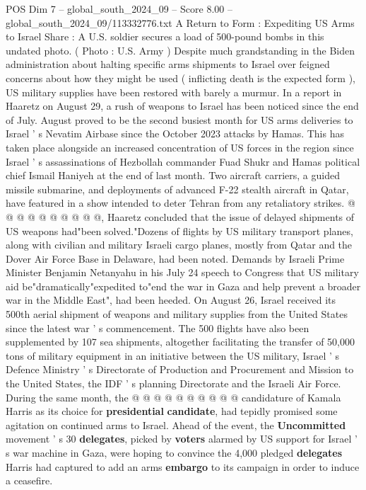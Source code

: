 \begin{textsample}{POS Dim 7 – global\_south\_2024\_09 – Score 8.00 – global\_south\_2024\_09/113332776.txt}  \label{ex:f7_pos_230}
A Return to Form : Expediting US Arms to Israel Share : A U.S. soldier secures a load of 500-pound bombs in this undated photo. ( Photo : U.S.
Army ) Despite much grandstanding in the Biden administration about halting specific arms shipments to Israel over feigned concerns about how they might be used ( inflicting death is the expected form ), US military supplies have been restored with barely a murmur.
In a report in Haaretz on August 29, a rush of weapons to Israel has been noticed since the end of July.
August proved to be the second busiest month for US arms deliveries to Israel ' s Nevatim Airbase since the October 2023 attacks by Hamas.
This has taken place alongside an increased concentration of US forces in the region since Israel ' s assassinations of Hezbollah commander Fuad Shukr and Hamas political chief Ismail Haniyeh at the end of last month.
Two aircraft carriers, a guided missile submarine, and deployments of advanced F-22 stealth aircraft in Qatar, have featured in a show intended to deter Tehran from any retaliatory strikes. @ @ @ @ @ @ @ @ @ @, Haaretz concluded that the issue of delayed shipments of US weapons had"been solved."Dozens of flights by US military transport planes, along with civilian and military Israeli cargo planes, mostly from Qatar and the Dover Air Force Base in Delaware, had been noted.
Demands by Israeli Prime Minister Benjamin Netanyahu in his July 24 speech to Congress that US military aid be"dramatically"expedited to"end the war in Gaza and help prevent a broader war in the Middle East", had been heeded.
On August 26, Israel received its 500th aerial shipment of weapons and military supplies from the United States since the latest war ' s commencement.
The 500 flights have also been supplemented by 107 sea shipments, altogether facilitating the transfer of 50,000 tons of military equipment in an initiative between the US military, Israel ' s Defence Ministry ' s Directorate of Production and Procurement and Mission to the United States, the IDF ' s planning Directorate and the Israeli Air Force.
During the same month, the @ @ @ @ @ @ @ @ @ @ candidature of Kamala Harris as its choice for \textbf{presidential} \textbf{candidate}, had tepidly promised some agitation on continued arms to Israel.
Ahead of the event, the \textbf{Uncommitted} movement ' s 30 \textbf{delegates}, picked by \textbf{voters} alarmed by US support for Israel ' s war machine in Gaza, were hoping to convince the 4,000 pledged \textbf{delegates} Harris had captured to add an arms \textbf{embargo} to its campaign in order to induce a ceasefire.

\end{textsample}
